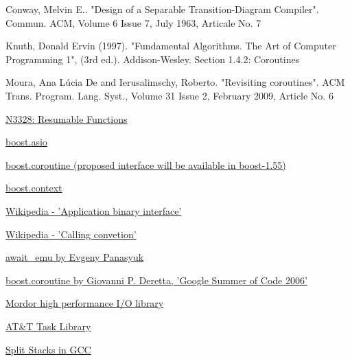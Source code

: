 \begin{thebibliography}{99}

        {Conway, Melvin E.. "Design of a Separable Transition-Diagram Compiler".
         Commun. ACM, Volume 6 Issue 7, July 1963, Articale No. 7}

        {Knuth, Donald Ervin (1997). "Fundamental Algorithms. The Art of Computer Programming 1", (3rd ed.).
         Addison-Wesley. Section 1.4.2: Coroutines}

        {Moura, Ana L\'{u}cia De and Ierusalimschy, Roberto. "Revisiting coroutines".
         ACM Trans. Program. Lang. Syst., Volume 31 Issue 2, February 2009, Article No. 6}

        \href{http://www.open-std.org/jtc1/sc22/wg21/docs/papers/2012/n3328.pdf}
        {N3328: Resumable Functions}

        \href{http://www.boost.org/doc/libs/1_54_0/doc/html/boost_asio.html}
        {boost.asio}

        \href{http://www.boost.org}
        {boost.coroutine (proposed interface will be available in boost-1.55)}

        \href{http://www.boost.org}
        {boost.context}

        \href{http://en.wikipedia.org/wiki/Application_binary_interface}
        {Wikipedia - 'Application binary interface'}

        \href{http://en.wikipedia.org/wiki/Calling_convention}
        {Wikipedia - 'Calling convetion'}

        \href{http://github.com/panaseleus/await_emu}
        {await\_emu by Evgeny Panasyuk}

        \href{http://www.crystalclearsoftware.com/soc/coroutine/}
        {boost.coroutine by Giovanni P. Deretta, 'Google Summer of Code 2006'}

        \href{http://code.mozy.com/projects/mordor}
        {Mordor high performance I/O library}

        \href{http://www.softwarepreservation.org/projects/c_plus_plus/cfront/release_2.0/doc/LibraryManual.pdf}
        {AT\&T Task Library}

        \href{http://gcc.gnu.org/wiki/SplitStacks}
        {Split Stacks in GCC}


\end{thebibliography}
